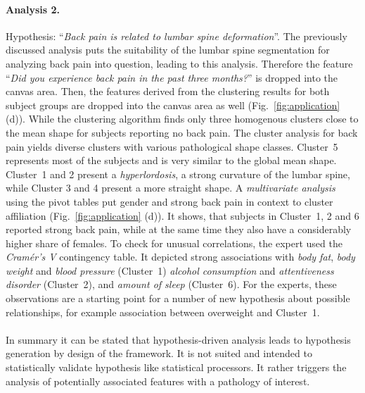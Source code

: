 \documentclass[journal]{style/vgtc} 			          %
\begin{document}
\paragraph{Analysis 2.}
Hypothesis: ``\emph{Back pain is related to lumbar spine deformation}''.
%
The previously discussed analysis puts the suitability of the lumbar spine segmentation for analyzing back pain into question, leading to this analysis.
%
Therefore the feature ``\emph{Did you experience back pain in the past three months?}'' is dropped into the canvas area. %
%
Then, the features derived from the clustering results for both subject groups are dropped into the canvas area as well (Fig.~\ref{fig:application} (d)).
%
While the clustering algorithm finds only three homogenous clusters close to the mean shape for subjects reporting no back pain.
%
The cluster analysis for back pain yields diverse clusters with various pathological shape classes.
%
Cluster~5 represents most of the subjects and is very similar to the global mean shape.
%
Cluster~1 and 2 present a \emph{hyperlordosis}, a strong curvature of the lumbar spine, while Cluster 3 and 4 present a more straight shape.
%
A \emph{multivariate analysis} using the pivot tables put gender and strong back pain in context to cluster affiliation (Fig.~\ref{fig:application} (d)). 
%
It shows, that subjects in Cluster~1, 2 and 6 reported strong back pain, while at the same time they also have a considerably higher share of females.
%
To check for unusual correlations, the expert used the \emph{Cram\'{e}r's V} contingency table.
%
It depicted strong associations with \emph{body fat}, \emph{body weight} and \emph{blood pressure} (Cluster~1) \emph{alcohol consumption} and \emph{attentiveness disorder} (Cluster~2), and \emph{amount of sleep} (Cluster~6).
%
For the experts, these observations are a starting point for a number of new hypothesis about possible relationships, for example association between overweight and Cluster~1.
%
\\\\
In summary it can be stated that hypothesis-driven analysis leads to hypothesis generation by design of the framework.
%
It is not suited and intended to statistically validate hypothesis like statistical processors.
%
It rather triggers the analysis of potentially associated features with a pathology of interest.
%
\end{document}
